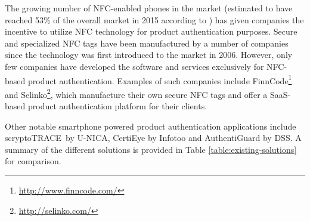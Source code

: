 \documentclass[thesis.tex]{subfiles}
\begin{document}
The growing number of NFC-enabled phones in the market (estimated to have reached 53\% of the overall market in 2015 according to \cite{frost-sullivan}) has given companies the incentive to utilize NFC technology for product authentication purposes. Secure and specialized NFC tags have been manufactured by a number of companies since the technology was first introduced to the market in 2006. However, only few companies have developed the software and services exclusively for NFC-based product authentication. Examples of such companies include FinnCode\footnote{\url{http://www.finncode.com/}} and Selinko\footnote{\url{http://selinko.com/}}, which manufacture their own secure NFC tags and offer a SaaS-based product authentication platform for their clients.

Other notable smartphone powered product authentication applications include scryptoTRACE\textregistered\ by U-NICA, CertiEye by Infotoo and AuthentiGuard by DSS. A summary of the different solutions is provided in Table \ref{table:existing-solutions} for comparison.
\end{document}
